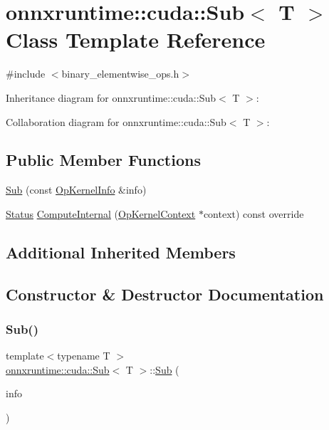\hypertarget{classonnxruntime_1_1cuda_1_1Sub}{}\section{onnxruntime\+:\+:cuda\+:\+:Sub$<$ T $>$ Class Template Reference}
\label{classonnxruntime_1_1cuda_1_1Sub}


{\ttfamily \#include $<$binary\+\_\+elementwise\+\_\+ops.\+h$>$}



Inheritance diagram for onnxruntime\+:\+:cuda\+:\+:Sub$<$ T $>$\+:


Collaboration diagram for onnxruntime\+:\+:cuda\+:\+:Sub$<$ T $>$\+:
\subsection*{Public Member Functions}
\begin{DoxyCompactItemize}
\item 
\mbox{\hyperlink{classonnxruntime_1_1cuda_1_1Sub_aeb2e4f58f734a8c5757e8af43150186d}{Sub}} (const \mbox{\hyperlink{classonnxruntime_1_1OpKernelInfo}{Op\+Kernel\+Info}} \&info)
\item 
\mbox{\hyperlink{classonnxruntime_1_1common_1_1Status}{Status}} \mbox{\hyperlink{classonnxruntime_1_1cuda_1_1Sub_aeb5dd41089760e5498a11583933a7976}{Compute\+Internal}} (\mbox{\hyperlink{classonnxruntime_1_1OpKernelContext}{Op\+Kernel\+Context}} $\ast$context) const override
\end{DoxyCompactItemize}
\subsection*{Additional Inherited Members}


\subsection{Constructor \& Destructor Documentation}
\mbox{\label{classonnxruntime_1_1cuda_1_1Sub_aeb2e4f58f734a8c5757e8af43150186d}} 
\subsubsection{\texorpdfstring{Sub()}{Sub()}}
{\footnotesize\ttfamily template$<$typename T $>$ \\
\mbox{\hyperlink{classonnxruntime_1_1cuda_1_1Sub}{onnxruntime\+::cuda\+::\+Sub}}$<$ T $>$\+::\mbox{\hyperlink{classonnxruntime_1_1cuda_1_1Sub}{Sub}} (\begin{DoxyParamCaption}\item[{const \mbox{\hyperlink{classonnxruntime_1_1OpKernelInfo}{Op\+Kernel\+Info}} \&}]{info }\end{DoxyParamCaption})\hspace{0.3cm}{\ttfamily [inline]}}



